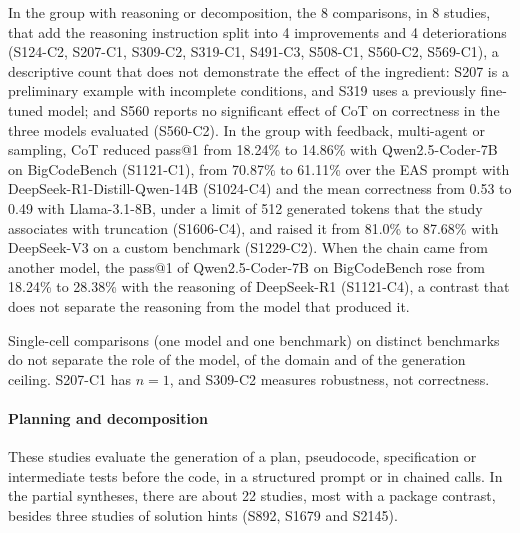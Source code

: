 In the group with reasoning or decomposition, the 8 comparisons, in 8 studies, that add the reasoning instruction split into 4 improvements and 4 deteriorations (S124-C2, S207-C1, S309-C2, S319-C1, S491-C3, S508-C1, S560-C2, S569-C1), a descriptive count that does not demonstrate the effect of the ingredient: S207 is a preliminary example with incomplete conditions, and S319 uses a previously fine-tuned model; and S560 reports no significant effect of CoT on correctness in the three models evaluated (S560-C2).
In the group with feedback, multi-agent or sampling, CoT reduced pass@1 from 18.24\% to 14.86\% with Qwen2.5-Coder-7B on BigCodeBench (S1121-C1), from 70.87\% to 61.11\% over the EAS prompt with DeepSeek-R1-Distill-Qwen-14B (S1024-C4) and the mean correctness from 0.53 to 0.49 with Llama-3.1-8B, under a limit of 512 generated tokens that the study associates with truncation (S1606-C4), and raised it from 81.0\% to 87.68\% with DeepSeek-V3 on a custom benchmark (S1229-C2).
When the chain came from another model, the pass@1 of Qwen2.5-Coder-7B on BigCodeBench rose from 18.24\% to 28.38\% with the reasoning of DeepSeek-R1 (S1121-C4), a contrast that does not separate the reasoning from the model that produced it.

Single-cell comparisons (one model and one benchmark) on distinct benchmarks do not separate the role of the model, of the domain and of the generation ceiling. S207-C1 has $n = 1$, and S309-C2 measures robustness, not correctness.

\paragraph{Planning and decomposition}
These studies evaluate the generation of a plan, pseudocode, specification or intermediate tests before the code, in a structured prompt or in chained calls. In the partial syntheses, there are about 22 studies, most with a package contrast, besides three studies of solution hints (S892, S1679 and S2145).

